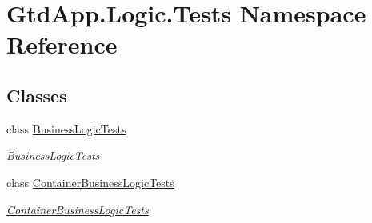 \hypertarget{namespace_gtd_app_1_1_logic_1_1_tests}{}\section{Gtd\+App.\+Logic.\+Tests Namespace Reference}
\label{namespace_gtd_app_1_1_logic_1_1_tests}
\subsection*{Classes}
\begin{DoxyCompactItemize}
\item 
class \mbox{\hyperlink{class_gtd_app_1_1_logic_1_1_tests_1_1_business_logic_tests}{Business\+Logic\+Tests}}
\begin{DoxyCompactList}\small\item\em \mbox{\hyperlink{class_gtd_app_1_1_logic_1_1_tests_1_1_business_logic_tests}{Business\+Logic\+Tests}} \end{DoxyCompactList}\item 
class \mbox{\hyperlink{class_gtd_app_1_1_logic_1_1_tests_1_1_container_business_logic_tests}{Container\+Business\+Logic\+Tests}}
\begin{DoxyCompactList}\small\item\em \mbox{\hyperlink{class_gtd_app_1_1_logic_1_1_tests_1_1_container_business_logic_tests}{Container\+Business\+Logic\+Tests}} \end{DoxyCompactList}\end{DoxyCompactItemize}
